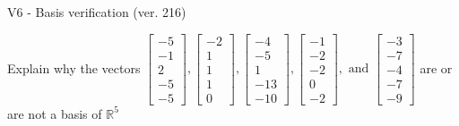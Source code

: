 \begin{exercise}
  \begin{exerciseTitle}V6 - Basis verification (ver. 216)\end{exerciseTitle}
  \begin{exerciseStatement}
    Explain why the vectors \(\left[\begin{array}{r}
-5 \\
-1 \\
2 \\
-5 \\
-5
\end{array}\right] , \left[\begin{array}{r}
-2 \\
1 \\
1 \\
1 \\
0
\end{array}\right] , \left[\begin{array}{r}
-4 \\
-5 \\
1 \\
-13 \\
-10
\end{array}\right] , \left[\begin{array}{r}
-1 \\
-2 \\
-2 \\
0 \\
-2
\end{array}\right] , \text{ and } \left[\begin{array}{r}
-3 \\
-7 \\
-4 \\
-7 \\
-9
\end{array}\right]\) are or are not a basis of \(\mathbb{R}^5\)	



\end{exerciseStatement}
\end{exercise}
